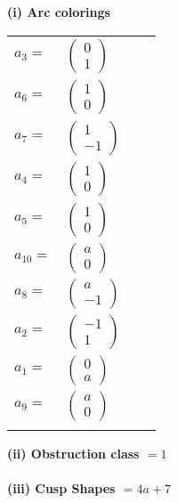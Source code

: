 \documentclass[1p]{elsarticle_modified}
\theoremstyle{definition}
\begin{document}
\flushleft \textbf{(i) Arc colorings}\\
\begin{tabular}{m{7pt} m{180pt} m{7pt} m{180pt} }
\flushright $a_{3}=$&$\begin{pmatrix}0\\1\end{pmatrix}$ \\
\flushright $a_{6}=$&$\begin{pmatrix}1\\0\end{pmatrix}$ \\
\flushright $a_{7}=$&$\begin{pmatrix}1\\-1\end{pmatrix}$ \\
\flushright $a_{4}=$&$\begin{pmatrix}1\\0\end{pmatrix}$ \\
\flushright $a_{5}=$&$\begin{pmatrix}1\\0\end{pmatrix}$ \\
\flushright $a_{10}=$&$\begin{pmatrix}a\\0\end{pmatrix}$ \\
\flushright $a_{8}=$&$\begin{pmatrix}a\\-1\end{pmatrix}$ \\
\flushright $a_{2}=$&$\begin{pmatrix}-1\\1\end{pmatrix}$ \\
\flushright $a_{1}=$&$\begin{pmatrix}0\\a\end{pmatrix}$ \\
\flushright $a_{9}=$&$\begin{pmatrix}a\\0\end{pmatrix}$\\&\end{tabular}
\flushleft \textbf{(ii) Obstruction class $= 1$}\\~\\
\flushleft \textbf{(iii) Cusp Shapes $= 4 a+7$}\\~\\
\end{document}
